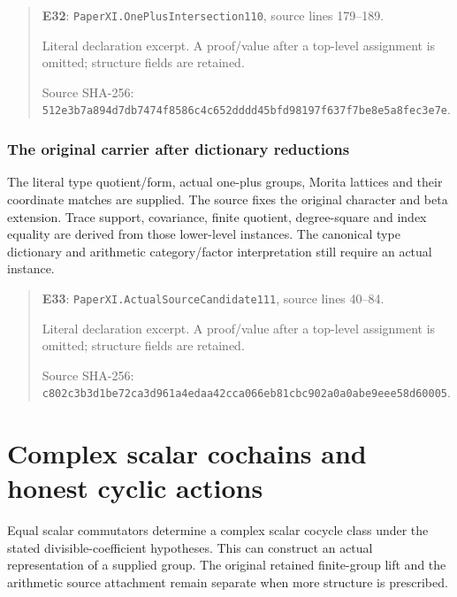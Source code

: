 \documentclass[10pt,oneside]{book}
\begin{document}
\begin{quote}\footnotesize\textbf{E32}: \nolinkurl{PaperXI.OnePlusIntersection110}, source lines 179--189.\par Literal declaration excerpt. A proof/value after a top-level assignment is omitted; structure fields are retained.\par Source SHA-256: {\scriptsize\texttt{512e3b7a894d7db7474f8586c4c652dddd45bfd98197f637f7be8e5a8fec3e7e}}.\end{quote}


\subsection{The original carrier after dictionary reductions}
\label{guide:E33}
The literal type quotient/form, actual one-plus groups, Morita lattices and their coordinate matches are supplied. The source fixes the original character and beta extension.
Trace support, covariance, finite quotient, degree-square and index equality are derived from those lower-level instances. The canonical type dictionary and arithmetic category/factor interpretation still require an actual instance.

\begin{quote}\footnotesize\textbf{E33}: \nolinkurl{PaperXI.ActualSourceCandidate111}, source lines 40--84.\par Literal declaration excerpt. A proof/value after a top-level assignment is omitted; structure fields are retained.\par Source SHA-256: {\scriptsize\texttt{c802c3b3d1be72ca3d961a4edaa42cca066eb81cbc902a0a0abe9eee58d60005}}.\end{quote}


\chapter{Complex scalar cochains and honest cyclic actions}
Equal scalar commutators determine a complex scalar cocycle class under the stated divisible-coefficient hypotheses. This can construct an actual representation of a supplied group. The original retained finite-group lift and the arithmetic source attachment remain separate when more structure is prescribed.
\end{document}
